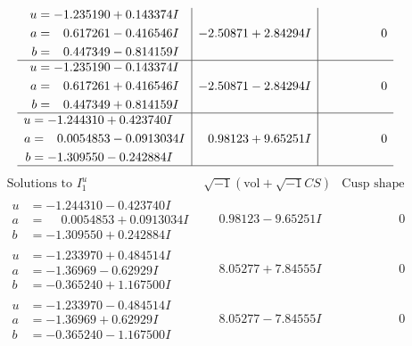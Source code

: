 \documentclass[1p]{elsarticle_modified}
\theoremstyle{definition}
\newcommand{\I}{\sqrt{-1}}
\begin{document}
$$\begin{array}{c|c|c}
\begin{aligned}
u &= -1.235190 + 0.143374 I \\
a &= \phantom{-}0.617261 - 0.416546 I \\
b &= \phantom{-}0.447349 - 0.814159 I\end{aligned}
 & -2.50871 + 2.84294 I & \phantom{-0.000000 } 0 \\ \hline\begin{aligned}
u &= -1.235190 - 0.143374 I \\
a &= \phantom{-}0.617261 + 0.416546 I \\
b &= \phantom{-}0.447349 + 0.814159 I\end{aligned}
 & -2.50871 - 2.84294 I & \phantom{-0.000000 } 0 \\ \hline\begin{aligned}
u &= -1.244310 + 0.423740 I \\
a &= \phantom{-}0.0054853 - 0.0913034 I \\
b &= -1.309550 - 0.242884 I\end{aligned}
 & \phantom{-}0.98123 + 9.65251 I & \phantom{-0.000000 } 0\\
 \hline 
 \end{array}$$\newpage$$\begin{array}{c|c|c}  
\text{Solutions to }I^u_{1}& \I (\text{vol} + \sqrt{-1}CS) & \text{Cusp shape}\\
 \hline 
\begin{aligned}
u &= -1.244310 - 0.423740 I \\
a &= \phantom{-}0.0054853 + 0.0913034 I \\
b &= -1.309550 + 0.242884 I\end{aligned}
 & \phantom{-}0.98123 - 9.65251 I & \phantom{-0.000000 } 0 \\ \hline\begin{aligned}
u &= -1.233970 + 0.484514 I \\
a &= -1.36969 - 0.62929 I \\
b &= -0.365240 + 1.167500 I\end{aligned}
 & \phantom{-}8.05277 + 7.84555 I & \phantom{-0.000000 } 0 \\ \hline\begin{aligned}
u &= -1.233970 - 0.484514 I \\
a &= -1.36969 + 0.62929 I \\
b &= -0.365240 - 1.167500 I\end{aligned}
 & \phantom{-}8.05277 - 7.84555 I & \phantom{-0.000000 } 0 \\ \hline\begin{aligned}

\end{aligned}
\end{array}$$
\end{document}
